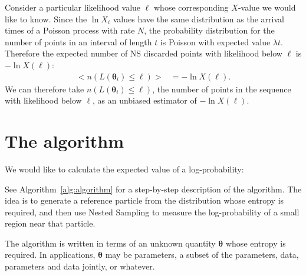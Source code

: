 \documentclass[entropy,article,accept,oneauthor,pdftex,10pt,a4paper]{mdpi}
\newcommand{\x}{\boldsymbol{\theta}}
\begin{document}
Consider a particular likelihood value $\ell$ whose corresponding $X$-value
we would like to know. Since the $\ln X_i$ values have the same distribution
as the arrival times of a Poisson process with rate $N$, the probability
distribution for the number of points in an interval of length $t$ is
Poisson with expected value $\lambda t$. Therefore the expected number of
NS discarded points with likelihood below $\ell$ is $-\ln X(\ell)$:
\begin{align}
\big< n(L(\x_i) \leq \ell) \big> &= -\ln X(\ell).
\end{align}
We can therefore take $n(L(\x_i) \leq \ell)$, the number of points in the
sequence with likelihood below $\ell$, as an unbiased estimator of
$-\ln X(\ell)$.

\section{The algorithm}

We would like to calculate the expected value of a log-probability:

See Algorithm~\ref{alg:algorithm} for a step-by-step description of the
algorithm. The idea is to generate a reference particle from the distribution
whose entropy is required, and then use Nested Sampling to measure the
log-probability of a small region near that particle.

The algorithm is written in terms of an unknown quantity $\x$
whose entropy is required. In applications, $\x$ may be parameters,
a subset of the parameters, data, parameters and data jointly, or
whatever.
\end{document}
